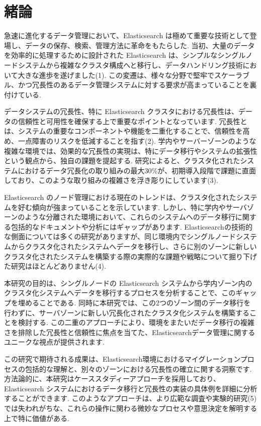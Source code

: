 \chapter{緒論}
\label{chap:first}

急速に進化するデータ管理において、Elasticsearch は極めて重要な技術として登場し、データの保存、検索、管理方法に革命をもたらした. 当初、大量のデータを効率的に処理するために設計された Elasticsearch は、シンプルなシングルノードシステムから複雑なクラスタ構成へと移行し、データハンドリング技術において大きな進歩を遂げました(1). この変遷は、様々な分野で堅牢でスケーラブル、かつ冗長性のあるデータ管理システムに対する要求が高まっていることを裏付けている. 

データシステムの冗長性、特に Elasticsearch クラスタにおける冗長性は、データの信頼性と可用性を確保する上で重要なポイントとなっています. 冗長性とは、システムの重要なコンポーネントや機能を二重化することで、信頼性を高め、一点障害のリスクを低減することを指す(2). 学内やサーバーゾーンのような複雑な環境では、効果的な冗長性の実現は、特にデータ移行やシステムの拡張性という観点から、独自の課題を提起する. 研究によると、クラスタ化されたシステムにおけるデータ冗長化の取り組みの最大30\%が、初期導入段階で課題に直面しており、このような取り組みの複雑さを浮き彫りにしています(3). 

Elasticsearch のノード管理における現在のトレンドは、クラスタ化されたシステムを好む傾向が強まっていることを示しています. しかし、特に学内やサーバゾーンのような分離された環境において、これらのシステムへのデータ移行に関する包括的なドキュメントや分析にはギャップがあります. Elasticsearchの技術的な側面については多くの研究がありますが、同じ環境内でシングルノードシステムからクラスタ化されたシステムへデータを移行し、さらに別のゾーンに新しいクラスタ化されたシステムを構築する際の実際的な課題や戦略について掘り下げた研究はほとんどありません(4). 

本研究の目的は、シングルノードの Elasticsearch システムから学内ゾーン内のクラスタ化システムへデータを移行するプロセスを分析することで、このギャップを埋めることである. 同時に本研究では、この2つのゾーン間のデータ移行を行わずに、サーバゾーンに新しい冗長化されたクラスタ化システムを構築することを検討する. この二重のアプローチにより、環境をまたいだデータ移行の複雑さを排除した冗長性と信頼性に焦点を当てた、Elasticsearchデータ管理に関するユニークな視点が提供されます. 

この研究で期待される成果は、Elasticsearch環境におけるマイグレーションプロセスの包括的な理解と、別々のゾーンにおける冗長性の確立に関する洞察です. 方法論的に、本研究はケーススタディーアプローチを採用しており、Elasticsearch システムにおけるデータ移行と冗長性の実装の具体例を詳細に分析することができます. このようなアプローチは、より広範な調査や実験的研究(5)では失われがちな、これらの操作に関わる微妙なプロセスや意思決定を解明する上で特に価値がある. 

